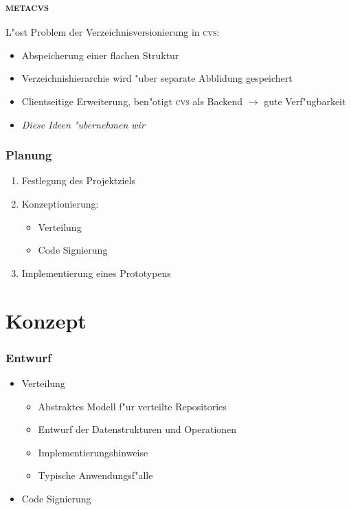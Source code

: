 \documentclass[german]{beamer}
\newcommand{\METACVS}{\textsc{metacvs}}
\newcommand{\CVS}{\textsc{cvs}}
\begin{document}
\begin{frame}
  \frametitle{\METACVS}
  L"ost Problem der Verzeichnisversionierung in \CVS:
  \begin{itemize}
  \item Abspeicherung einer flachen Struktur
  \item Verzeichnishierarchie wird "uber separate Abblidung
    gespeichert
  \item Clientseitige Erweiterung, ben"otigt \CVS{} als Backend
    $\rightarrow$ gute Verf"ugbarkeit
  \item \emph{Diese Ideen "ubernehmen wir}
  \end{itemize}
\end{frame}

\begin{frame}
  \frametitle{Planung}
  \begin{enumerate}
  \item Festlegung des Projektziels
  \item Konzeptionierung:
    \begin{itemize}
    \item Verteilung
    \item Code Signierung
    \end{itemize}
  \item Implementierung eines Prototypens
  \end{enumerate}
\end{frame}

\section{Konzept}

\begin{frame}
  \frametitle{Entwurf}
  \begin{itemize}
  \item Verteilung
    \begin{itemize}
    \item Abstraktes Modell f"ur verteilte Repositories
    \item Entwurf der Datenstrukturen und Operationen
    \item Implementierungshinweise
    \item Typische Anwendungsf"alle
    \end{itemize}
  \item Code Signierung
  \end{itemize}
\end{frame}
\end{document}
